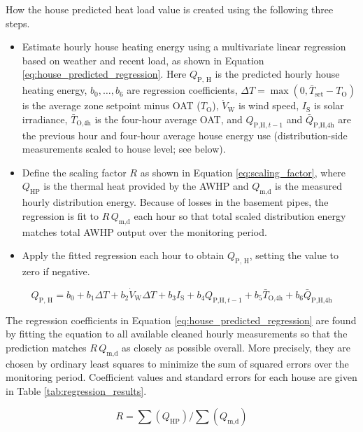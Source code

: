 
How the house predicted heat load value is created using the following three steps.

\begin{itemize}
    \item Estimate hourly house heating energy using a multivariate linear regression based on weather and recent load, as shown in Equation \ref{eq:house_predicted_regression}. Here $Q_\text{P, H}$ is the predicted hourly house heating energy, $b_0,\ldots,b_6$ are regression coefficients, $\Delta T = \max(0, \bar{T}_\text{set} - T_\text{O})$ is the average zone setpoint minus OAT ($T_\text{O}$), $\dot{V}_\text{W}$ is wind speed, $I_\text{S}$ is solar irradiance, $\bar{T}_\text{O,4h}$ is the four-hour average OAT, and $Q_{\text{P,H},t-1}$ and $\bar{Q}_\text{P,H,4h}$ are the previous hour and four-hour average house energy use (distribution-side measurements scaled to house level; see below).
    \item Define the scaling factor $R$ as shown in Equation \ref{eq:scaling_factor}, where $Q_\text{HP}$ is the thermal heat provided by the AWHP and $Q_{\text{m,d}}$ is the measured hourly distribution energy. Because of losses in the basement pipes, the regression is fit to $R\,Q_{\text{m,d}}$ each hour so that total scaled distribution energy matches total AWHP output over the monitoring period.
    \item Apply the fitted regression each hour to obtain $Q_\text{P, H}$, setting the value to zero if negative.
\end{itemize}


\begin{equation}
Q_\text{P, H} = b_0 + b_1 \Delta T + b_2 \dot{V}_\text{W} \Delta T + b_3 I_\text{S} + b_4 Q_{\text{P,H},t-1} + b_5 \bar{T}_\text{O,4h} + b_6 \bar{Q}_\text{P,H,4h}
\label{eq:house_predicted_regression}
\end{equation}


The regression coefficients in Equation \ref{eq:house_predicted_regression} are found by fitting the equation to all available cleaned hourly measurements so that the prediction matches $R\,Q_{\text{m,d}}$ as closely as possible overall. More precisely, they are chosen by ordinary least squares to minimize the sum of squared errors over the monitoring period. Coefficient values and standard errors for each house are given in Table \ref{tab:regression_results}.


\begin{equation}
R = \sum(Q_\text{HP}) / \sum(Q_{\text{m,d}})
\label{eq:scaling_factor}
\end{equation}

